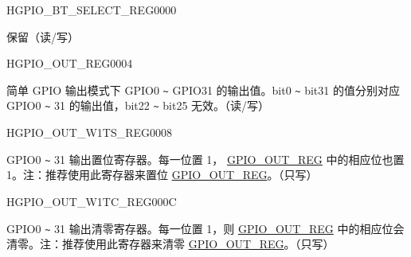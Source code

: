 ﻿\begin{register}{H}{GPIO\_BT\_SELECT\_REG}{\hexprefix{}0000}\label{regdesc:GPIOBTSELECTREG}
%
\regnewline%
\begin{regdesc}\begin{reglist}
\label{fielddesc:GPIOBTSEL}\item [GPIO\_BT\_SEL] 保留（读/写）
\end{reglist}\end{regdesc}
\end{register}


\begin{register}{H}{GPIO\_OUT\_REG}{\hexprefix{}0004}\label{regdesc:GPIOOUTREG}
%
\regnewline%
\begin{regdesc}\begin{reglist}
\label{fielddesc:GPIOOUTDATAORIG}\item [GPIO\_OUT\_DATA\_ORIG] 简单 GPIO 输出模式下 GPIO0 \verb+~+ GPIO31 的输出值。bit0 \verb+~+ bit31 的值分别对应 GPIO0 \verb+~+ 31 的输出值，bit22 \verb+~+ bit25 无效。（读/写）
\end{reglist}\end{regdesc}
\end{register}


\begin{register}{H}{GPIO\_OUT\_W1TS\_REG}{\hexprefix{}0008}\label{regdesc:GPIOOUTW1TSREG}
%
\regnewline%
\begin{regdesc}\begin{reglist}
\label{fielddesc:GPIOOUTW1TS}\item [GPIO\_OUT\_W1TS] GPIO0 \verb+~+ 31 输出置位寄存器。每一位置 1， \hyperref[regdesc:GPIOOUTREG]{GPIO\_OUT\_REG} 中的相应位也置 1。注：推荐使用此寄存器来置位 \hyperref[regdesc:GPIOOUTREG]{GPIO\_OUT\_REG}。（只写）
\end{reglist}\end{regdesc}
\end{register}


\begin{register}{H}{GPIO\_OUT\_W1TC\_REG}{\hexprefix{}000C}\label{regdesc:GPIOOUTW1TCREG}
%
\regnewline%
\begin{regdesc}\begin{reglist}
\label{fielddesc:GPIOOUTW1TC}\item [GPIO\_OUT\_W1TC] GPIO0 \verb+~+ 31 输出清零寄存器。每一位置 1，则 \hyperref[regdesc:GPIOOUTREG]{GPIO\_OUT\_REG} 中的相应位会清零。注：推荐使用此寄存器来清零 \hyperref[regdesc:GPIOOUTREG]{GPIO\_OUT\_REG}。（只写）
\end{reglist}\end{regdesc}
\end{register}


